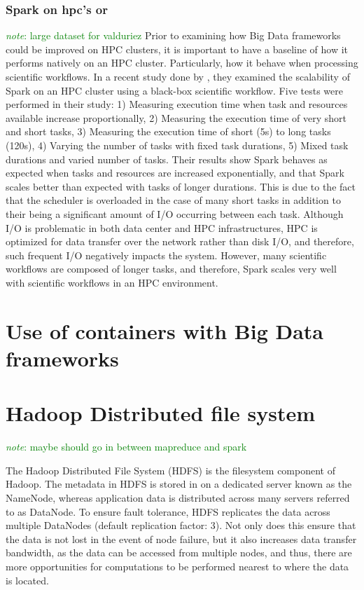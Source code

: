 \documentclass{report}
\newcommand{\note}[1]{\textcolor{green}{\textit{note}: #1}}
\begin{document}
        \subsubsection{Spark on hpc's or } 
            \note{large dataset for valduriez} Prior to
    examining how Big Data frameworks could be improved on HPC clusters, it is
    important to have a baseline of how it performs natively on an HPC cluster.
    Particularly, how it behave when processing scientific workflows. In a recent
    study done by \cite{valduriez}, they examined the scalability of Spark on an HPC
    cluster using a black-box scientific workflow. Five tests were performed in
    their study: 1) Measuring execution time when task and resources available
    increase proportionally, 2) Measuring the execution time of very short and short
    tasks, 3) Measuring the execution time of short (5s) to long tasks (120s), 4)
    Varying the number of tasks with fixed task durations, 5) Mixed task durations
    and varied number of tasks. Their results show Spark behaves as expected when
    tasks and resources are increased exponentially, and that Spark scales better
    than expected with tasks of longer durations. This is due to the fact that the
    scheduler is overloaded in the case of many short tasks in addition to their
    being a significant amount of I/O occurring between each task. Although I/O is
    problematic in both data center and HPC infrastructures, HPC is optimized for
    data transfer over the network rather than disk I/O, and therefore, such
    frequent I/O negatively impacts the system. However, many scientific workflows
    are composed of longer tasks, and therefore, Spark scales very well with
    scientific workflows in an HPC environment.
     \section{Use of containers with Big Data frameworks}
     \section{Hadoop Distributed file system} 
        \note{maybe should go in between mapreduce and spark} 

        The Hadoop Distributed File System (HDFS)\cite{hadoop} 
        is the filesystem component of Hadoop. The metadata in 
        HDFS is stored in on a dedicated server known as the 
        NameNode, whereas application data is distributed across 
        many servers referred to as DataNode. To ensure fault 
        tolerance, HDFS replicates the data across multiple 
        DataNodes (default replication factor: 3). Not only does 
        this ensure that the data is not lost in the event of node
        failure, but it also increases data transfer bandwidth, as
        the data can be accessed from multiple nodes, and thus, 
        there are more opportunities for computations to be 
        performed nearest to where the data is located. 
\end{document}
